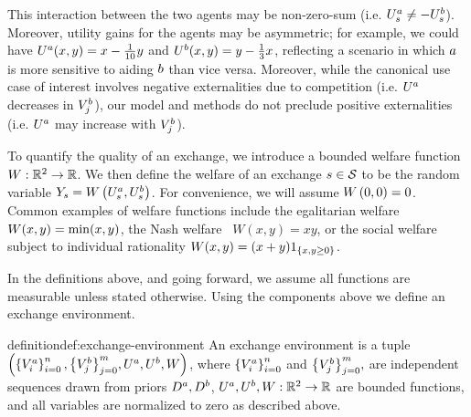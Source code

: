 This interaction between the two agents may be non-zero-sum (i.e. $U^a_{s} \neq -U^b_{s}$).
Moreover, utility gains for the agents may be asymmetric;
for example, we could have
\(
    U^a(x,y)=x-\frac{1}{10}y
\)
and
\(
    U^b(x,y)=y-\frac{1}{3}x
\),
reflecting a scenario in which $a$ is more sensitive to aiding $b$ than
vice versa.
Moreover, while the canonical use case of interest involves negative externalities due to competition (i.e. $U^a$ decreases in $V^b_{j}$), 
our model and methods do not preclude positive externalities (i.e. $U^a$ may increase with $V^b_{j}$).




To quantify the quality of an exchange,
we introduce a bounded welfare function
\(
    W:\mathbb{R}^2\rightarrow\mathbb{R}
\).
We then define the welfare of an exchange $s\in\mathcal{S}$ to be the random variable
\(
    Y_{s}
    =
    W\left(
        U^a_{s},U^b_{s}
    \right)
\).
For convenience, we will assume
\(
    W\left(0,0\right)=0
\).
Common examples of welfare functions  include the egalitarian welfare~\citep{mas1995microeconomic}
$W(x,y)=\min(x,y)$, the 
Nash welfare~\citep{nash1950bargaining} $W(x,y)=xy$, or the social welfare subject to individual rationality 
$W(x,y)=(x+y) 1_{\left\{x,y\geq 0\right\}}$.




In the definitions above, and going forward, we assume all functions are measurable unless stated otherwise.
Using the components above we define an exchange environment.

\begin{restatable}{definition}{def:exchange-environment}
    An exchange environment is a tuple
    \(
        \left(
            \left\{
                V^a_{i}
            \right\}_{i=0}^n,
            \big\{
                V^b_{j}
            \big\}_{j=0}^m,
            U^a,
            U^b,
            W
        \right)
    \),
    where
    \(
        \left\{
            V^a_{i}
        \right\}_{i=0}^n
    \)
    and
    \(
        \big\{
            V^b_{j}
        \big\}_{j=0}^m,
    \)
    are independent sequences drawn from priors $D^a, D^b$,
    \(
        U^a,U^b,W : \mathbb{R}^2\rightarrow\mathbb{R}
    \)
    are bounded functions, 
    and all variables are normalized to zero as described above.
\end{restatable}  

